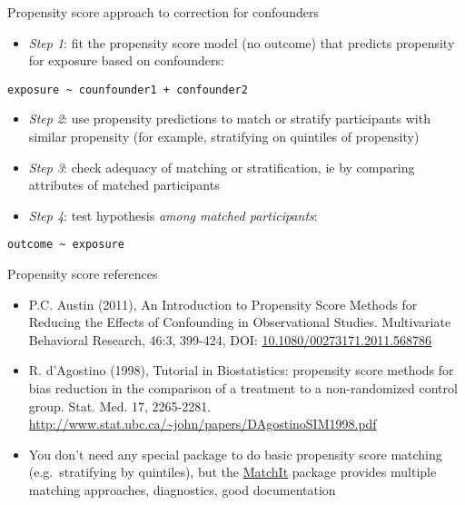 \documentclass[
  ignorenonframetext,
]{beamer}
\providecommand{\tightlist}{%
  \setlength{\itemsep}{0pt}\setlength{\parskip}{0pt}}
\begin{document}
\begin{frame}[fragile]{Propensity score approach to correction for
confounders}
\protect\hypertarget{propensity-score-approach-to-correction-for-confounders}{}

\begin{itemize}
\tightlist
\item
  \emph{Step 1}: fit the propensity score model (no outcome) that
  predicts propensity for exposure based on confounders:
\end{itemize}

\begin{verbatim}
exposure ~ counfounder1 + confounder2
\end{verbatim}

\begin{itemize}
\item
  \emph{Step 2}: use propensity predictions to match or stratify
  participants with similar propensity (for example, stratifying on
  quintiles of propensity)
\item
  \emph{Step 3}: check adequacy of matching or stratification, ie by
  comparing attributes of matched participants
\item
  \emph{Step 4}: test hypothesis \emph{among matched participants}:
\end{itemize}

\begin{verbatim}
outcome ~ exposure
\end{verbatim}

\end{frame}

\begin{frame}{Propensity score references}
\protect\hypertarget{propensity-score-references}{}

\begin{itemize}
\tightlist
\item
  P.C. Austin (2011), An Introduction to Propensity Score Methods for
  Reducing the Effects of Confounding in Observational Studies.
  Multivariate Behavioral Research, 46:3, 399-424, DOI:
  \href{http://dx.doi.org/10.1080/00273171.2011.568786}{10.1080/00273171.2011.568786}
\item
  R. d'Agostino (1998), Tutorial in Biostatistics: propensity score
  methods for bias reduction in the comparison of a treatment to a
  non-randomized control group. Stat. Med. 17, 2265-2281.
  \url{http://www.stat.ubc.ca/~john/papers/DAgostinoSIM1998.pdf}
\item
  You don't need any special package to do basic propensity score
  matching (e.g.~stratifying by quintiles), but the
  \href{https://cran.r-project.org/package=MatchIt}{MatchIt} package
  provides multiple matching approaches, diagnostics, good documentation
\end{itemize}

\end{frame}
\end{document}
